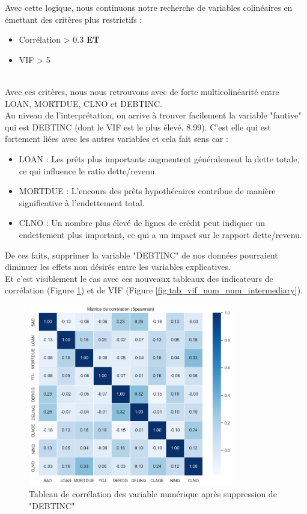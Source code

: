 \documentclass[a4paper,12pt]{report}
\begin{document}
\clearpage

Avec cette logique, nous continuons notre recherche de variables colinéaires en émettant des critères plus restrictifs :

\begin{itemize}
  \item Corrélation > 0.3 \textbf{ET}
  \item VIF > 5
\end{itemize}
\ \\

Avec ces critères, nous nous retrouvons avec de forte multicolinéarité entre LOAN, MORTDUE, CLNO et DEBTINC.\\
Au niveau de l'interprétation, on arrive à trouver facilement la variable "fautive" qui est DEBTINC (dont le VIF est le plus élevé, 8.99). C'est elle qui est fortement liées avec les autres variables et cela fait sens car :
\begin{itemize}
  \item LOAN : Les prêts plus importants augmentent généralement la dette totale, ce qui influence le ratio dette/revenu. 
  \item MORTDUE : L'encours des prêts hypothécaires contribue de manière significative à l'endettement total.  
  \item CLNO : Un nombre plus élevé de lignes de crédit peut indiquer un endettement plus important, ce qui a un impact sur le rapport dette/revenu.  
\end{itemize}

De ces faits, supprimer la variable "DEBTINC" de nos données pourraient diminuer les effets non désirés entre les variables explicatives.\\
Et c'est visiblement le cas avec ces nouveaux tableaux des indicateurs de corrélation (Figure \ref{fig:tab_corr_num_num_intermediary}) et de VIF (Figure \ref{fig:tab_vif_num_num_intermediary}).

\begin{figure}[h!]
  \begin{center}
    \includegraphics[width=0.8\textwidth]{../images/tab_corr_num_num_intermediary}
  \end{center}
  \caption{Tableau de corrélation des variable numérique après suppression de "DEBTINC"}
  \label{fig:tab_corr_num_num_intermediary}
\end{figure}
\end{document}
